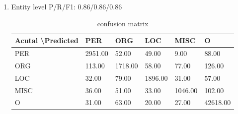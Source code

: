 \documentclass[10pt]{article}
\begin{document}
\begin{enumerate}[label=(\alph*)]
\begin{figure}[ht]
    \qquad
\end{figure}


\item
Entity level P/R/F1: 0.86/0.86/0.86\\
\begin{table}[h]
	\centering
	\caption{confusion matrix}
	\begin{tabular}{|l|l|l|l|l|l|}
	\hline
	Acutal \textbackslash Predicted & PER     & ORG     & LOC     & MISC    & O        \\ \hline
	PER   & 2951.00 & 52.00   & 49.00   & 9.00   & 88.00    \\ \hline
	ORG   & 113.00  & 1718.00 & 58.00   & 77.00   & 126.00   \\ \hline
	LOC   & 32.00   & 79.00  & 1896.00 & 31.00   & 57.00    \\ \hline
	MISC  & 36.00   & 51.00   & 33.00   & 1046.00 & 102.00   \\ \hline
	O     & 31.00   & 63.00   & 20.00   & 27.00   & 42618.00 \\ \hline
	\end{tabular}
\end{table}

\end{enumerate}
\end{document}
